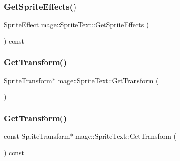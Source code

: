 \subsubsection{\texorpdfstring{Get\+Sprite\+Effects()}{GetSpriteEffects()}}
{\footnotesize\ttfamily \hyperlink{namespacemage_a9cfe18123066ba4236f548f9de75d881}{Sprite\+Effect} mage\+::\+Sprite\+Text\+::\+Get\+Sprite\+Effects (\begin{DoxyParamCaption}{ }\end{DoxyParamCaption}) const}

\hypertarget{classmage_1_1_sprite_text_a1ba88df7fac17dc88d958fa4a841b7f1}{}\label{classmage_1_1_sprite_text_a1ba88df7fac17dc88d958fa4a841b7f1} 
\subsubsection{\texorpdfstring{Get\+Transform()}{GetTransform()}\hspace{0.1cm}{\footnotesize\ttfamily [1/2]}}
{\footnotesize\ttfamily Sprite\+Transform$\ast$ mage\+::\+Sprite\+Text\+::\+Get\+Transform (\begin{DoxyParamCaption}{ }\end{DoxyParamCaption})}

\hypertarget{classmage_1_1_sprite_text_a6e2baafdb30e47405f6199ca24194934}{}\label{classmage_1_1_sprite_text_a6e2baafdb30e47405f6199ca24194934} 
\subsubsection{\texorpdfstring{Get\+Transform()}{GetTransform()}\hspace{0.1cm}{\footnotesize\ttfamily [2/2]}}
{\footnotesize\ttfamily const Sprite\+Transform$\ast$ mage\+::\+Sprite\+Text\+::\+Get\+Transform (\begin{DoxyParamCaption}{ }\end{DoxyParamCaption}) const}

\hypertarget{classmage_1_1_sprite_text_a72f926162887270cef780251561a2155}{}\label{classmage_1_1_sprite_text_a72f926162887270cef780251561a2155} 
